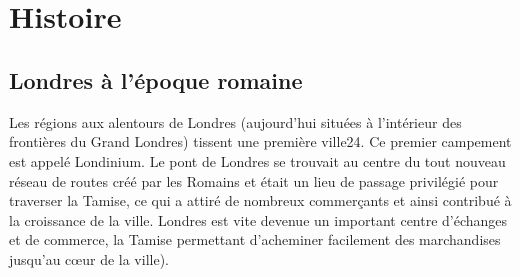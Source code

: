 \documentclass{article}
\begin{document}
\begin{table}
\begin{center}
\end{center}
\caption{Relevé météorologique de Londres Kew Gardens (période : 1981-2010)}
\label{climat}
\end{table}
\ \\ \ \\

\newpage
\section{Histoire}
\subsection{Londres à l'époque romaine}

Les régions aux alentours de Londres (aujourd'hui situées à l'intérieur des frontières du Grand Londres) tissent une première ville24. Ce premier campement est appelé Londinium. Le pont de Londres se trouvait au centre du tout nouveau réseau de routes créé par les Romains et était un lieu de passage privilégié pour traverser la Tamise, ce qui a attiré de nombreux commerçants et ainsi contribué à la croissance de la ville. Londres est vite devenue un important centre d'échanges et de commerce, la Tamise permettant d'acheminer facilement des marchandises jusqu'au cœur de la ville).
\end{document}
